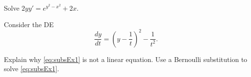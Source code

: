 \begin{exercise}\ansMark
Solve $2yy' = e^{y^2-x^2} + 2x$.
\end{exercise}

\begin{exercise}
Consider the  DE 
\begin{equation}
\frac{dy}{dt}=\left( y -\frac{1}{t} \right)^2 - \frac{1}{t^2}. \label{eq:subsEx1}
\end{equation} %
\begin{tasks}
\task Explain why \eqref{eq:subsEx1} is not a linear equation.
\task Use a Bernoulli substitution to solve \eqref{eq:subsEx1}.
\end{tasks}
\end{exercise}

\setcounter{exercise}{100}

